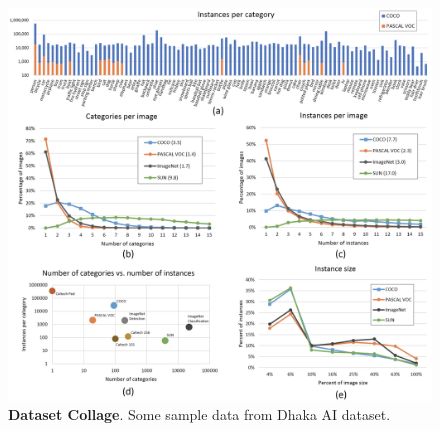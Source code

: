 \begin{figure}[H] %
  \centering
  \includegraphics[width=\textwidth]{figures/paper/coco-details.png}
  \caption[Dataset Collage]{\textbf{Dataset Collage}. Some sample data from Dhaka AI dataset.}
  \label{fig:figures/paper/coco-details.png}
\end{figure}

